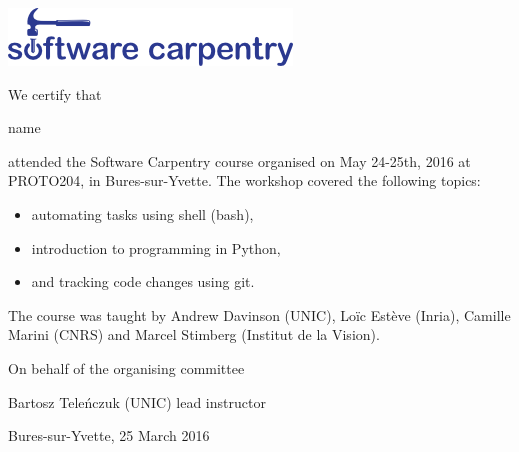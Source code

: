 \documentclass[a4paper,12pt]{article}
\begin{document}
\thispagestyle{empty}
\begin{center}
\includegraphics{software-carpentry-banner.png}
\vspace{2.5cm}
\end{center}

We certify that

\vspace{1cm}

\begin{center}

    {\Large {{ name }}}

\end{center}

\vspace{1cm}

\noindent attended the Software Carpentry course organised on May 24-25th, 2016 at PROTO204, in Bures-sur-Yvette. The workshop covered the following topics:

\begin{itemize}
    \item automating tasks using shell (bash),
    \item introduction to programming in Python,
    \item and tracking code changes using git.
\end{itemize} 

The course was taught by Andrew Davinson (UNIC), Loïc Estève (Inria), Camille Marini (CNRS) and Marcel Stimberg (Institut de la Vision).

\vspace{1cm}


\noindent On behalf of the organising committee

\vspace{2cm}

\noindent Bartosz Tele\'{n}czuk (UNIC) \newline
lead instructor

\vspace{1cm}

\noindent Bures-sur-Yvette, 25 March 2016
\end{document}
